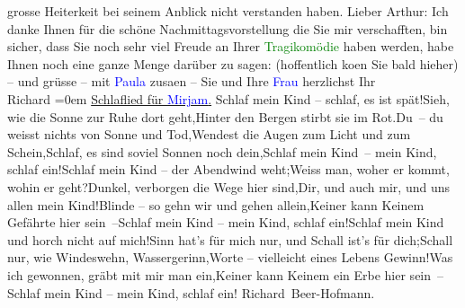                grosse Heiterkeit bei seinem Anblick nicht verstanden haben.\pend
           \pstart
           Lieber Arthur: Ich danke Ihnen für die schöne Nachmittagsvorstellung die Sie mir
               verschafften, bin sicher, dass Sie noch sehr viel Freude an Ihrer \textcolor{green}{Tragikomödie}{} haben werden, habe Ihnen noch
               eine ganze Menge darüber zu sagen: (hoffentlich ko{\geminationm}en
               Sie bald hieher) – und grüsse – mit \textcolor{blue}{Paula}{}\ledrightnote{\textcolor{blue}{Paula Beer-Hofmann}} zusa{\geminationm}en – Sie und Ihre \textcolor{blue}{Frau}{} herzlichst\pend
           \pstart
           Ihr{\\[\baselineskip]}\spacefill\mbox{Richard}\pend
           \leftskip=0em{}{\bigskip}\pstart
           \noindent{}\centering{}{\pb}\uline{Schlaflied für \textcolor{blue}{Mirjam}{}\ledrightnote{\textcolor{blue}{Mirjam Beer-Hofmann}}.}\pend
           {\bigskip}\stanza{}Schlaf mein Kind – schlaf, es ist spät!\newverse{}Sieh, wie die Sonne zur Ruhe dort geht,\newverse{}Hinter den Bergen stirbt sie im Rot.\newverse{}Du – du weisst nichts von Sonne und Tod,\newverse{}Wendest die Augen zum Licht und zum Schein,\newverse{}Schlaf, es sind soviel Sonnen noch dein,\newverse{}Schlaf mein Kind – mein Kind, schlaf ein!\stanzaend{}\stanza{}Schlaf mein Kind – der Abendwind weht;\newverse{}Weiss man, woher er kommt, wohin er geht?\newverse{}Dunkel, verborgen die Wege hier sind,\newverse{}Dir, und auch mir, und uns allen mein Kind!\newverse{}Blinde – so gehn wir und gehen allein,\newverse{}Keiner kann Keinem Gefährte hier sein –\newverse{}Schlaf mein Kind – mein Kind, schlaf ein!\stanzaend{}\stanza{}Schlaf mein Kind und horch nicht auf mich!\newverse{}Sinn hat’s für mich nur, und Schall ist’s für dich;\newverse{}Schall nur, wie Windeswehn, Wassergerinn,\newverse{}Worte – vielleicht eines Lebens Gewinn!\newverse{}Was ich gewonnen, gräbt mit mir man ein,\newverse{}Keiner kann Keinem ein Erbe hier sein –\newverse{}Schlaf mein Kind – mein Kind, schlaf ein!\stanzaend{}\pstart
           \spacefill\mbox{Richard Beer-Hofmann.}\pend
           \endnumbering{}  
      